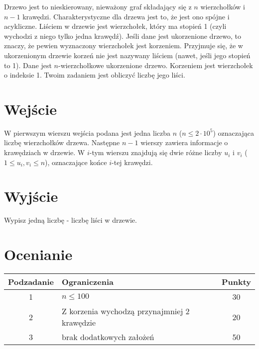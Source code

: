 \documentclass{spiral}
\begin{document}
    \makeheader

    Drzewo jest to nieskierowany, nieważony graf
    składający się z $n$ wierzchołków i $n-1$ krawędzi.
    Charakterystyczne dla drzewa jest to, że jest ono spójne i acykliczne.
    Liściem w drzewie jest wierzchołek, który ma stopień 1
    (czyli wychodzi z niego tylko jedna krawędź).
    Jeśli dane jest ukorzenione drzewo, to znaczy,
    że pewien wyznaczony wierzchołek jest korzeniem.
    Przyjmuje się, że w ukorzenionym drzewie korzeń nie jest nazywany liściem
    (nawet, jeśli jego stopień to 1).
    Dane jest $n$-wierzchołkowe ukorzenione drzewo.
    Korzeniem jest wierzchołek o indeksie 1.  
    Twoim zadaniem jest obliczyć liczbę jego liści.

\section{Wejście}

    W pierwszym wierszu wejścia podana jest jedna liczba $n$ ($n \leq 2 \cdot 10^5$)
    oznaczająca liczbę wierzchołków drzewa.
    Następne $n-1$ wierszy zawiera informacje o krawędziach w drzewie.
    W $i$-tym wierszu znajdują się dwie różne liczby $u_i$ i $v_i$
    ($1 \leq u_i, v_i \leq n$), oznaczające końce $i$-tej krawędzi.

\section{Wyjście}

    Wypisz jedną liczbę - liczbę liści w drzewie.


\section{Ocenianie}

    \begin{center}
        \begin{tabular}{|c|p{5cm}|c|}
            \hline
            \textbf{Podzadanie} & \textbf{Ograniczenia} & \textbf{Punkty} \\
            \hline
            1 & $n \leq 100$ & 30 \\
            \hline
            2 & Z korzenia wychodzą przynajmniej 2 krawędzie & 20 \\
            \hline
            3 & brak dodatkowych założeń & 50 \\
            \hline
        \end{tabular}
    \end{center}
\end{document}
